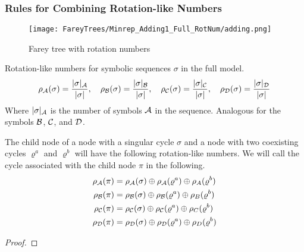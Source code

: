 \subsubsection{Rules for Combining Rotation-like Numbers}

\begin{figure}
    \centering
    \texttt{[image: FareyTrees/Minrep\_Adding1\_Full\_RotNum/adding.png]}
    \caption{Farey tree with rotation numbers}
\end{figure}

\begin{definition}
    Rotation-like numbers for symbolic sequences $\sigma$ in the full model.
    \begin{align*}
        \rho_{\mathcal{A}}(\sigma) = \dfrac{|\sigma|_{\mathcal{A}}}{|\sigma|}, \quad
        \rho_{\mathcal{B}}(\sigma) = \dfrac{|\sigma|_{\mathcal{B}}}{|\sigma|}, \quad
        \rho_{\mathcal{C}}(\sigma) = \dfrac{|\sigma|_{\mathcal{C}}}{|\sigma|}, \quad
        \rho_{\mathcal{D}}(\sigma) = \dfrac{|\sigma|_{\mathcal{D}}}{|\sigma|}
    \end{align*}
    Where $|\sigma|_{\mathcal{A}}$ is the number of symbols $\mathcal{A}$ in the sequence.
    Analogous for the symbols $\mathcal{B}$, $\mathcal{C}$, and $\mathcal{D}$.
\end{definition}

\begin{definition}
\end{definition}

\begin{theorem}
    The child node of a node with a singular cycle $\sigma$ and a node with two coexisting cycles $\varrho^a$ and $\varrho^b$ will have the following rotation-like numbers.
    We will call the cycle associated with the child node $\pi$ in the following.
    \begin{align*}
        \rho_{\mathcal{A}}(\pi) & =
        \rho_{\mathcal{A}}(\sigma) \oplus \rho_{\mathcal{A}}(\varrho^a) \oplus \rho_A(\varrho^b) \\
        \rho_{\mathcal{B}}(\pi) & =
        \rho_{\mathcal{B}}(\sigma) \oplus \rho_{\mathcal{B}}(\varrho^a) \oplus \rho_B(\varrho^b) \\
        \rho_{\mathcal{C}}(\pi) & =
        \rho_{\mathcal{C}}(\sigma) \oplus \rho_{\mathcal{C}}(\varrho^a) \oplus \rho_C(\varrho^b) \\
        \rho_{\mathcal{D}}(\pi) & =
        \rho_{\mathcal{D}}(\sigma) \oplus \rho_{\mathcal{D}}(\varrho^a) \oplus \rho_D(\varrho^b)
    \end{align*}
\end{theorem}

\begin{proof}
\end{proof}

